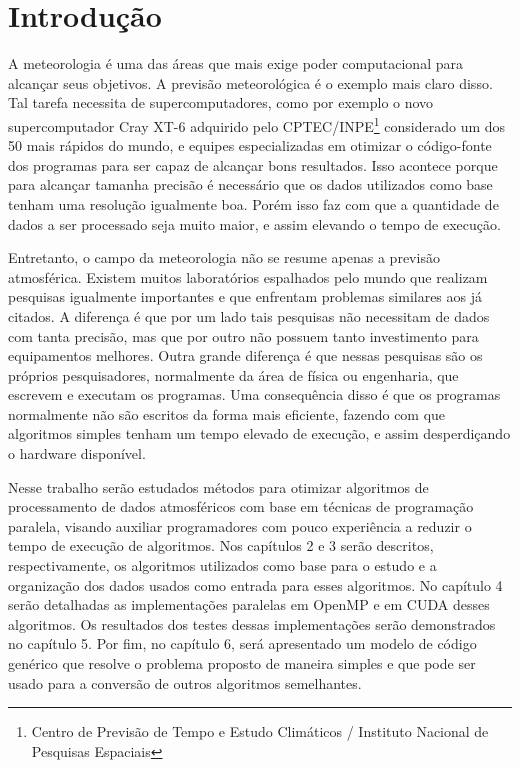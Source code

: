\chapter{Introdução}

A meteorologia é uma das áreas que mais exige poder computacional para alcançar seus objetivos. A previsão meteorológica é o exemplo mais claro disso. Tal tarefa necessita de supercomputadores, como por exemplo o novo supercomputador Cray XT-6 adquirido pelo CPTEC/INPE\footnote{Centro de Previsão de Tempo e Estudo Climáticos / Instituto Nacional de Pesquisas Espaciais} considerado um dos 50 mais rápidos do mundo, e equipes especializadas em otimizar o código-fonte dos programas para ser capaz de alcançar bons resultados. Isso acontece porque para alcançar tamanha precisão é necessário que os dados utilizados como base tenham uma resolução igualmente boa. Porém isso faz com que a quantidade de dados a ser processado seja muito maior, e assim elevando o tempo de execução.

Entretanto, o campo da meteorologia não se resume apenas a previsão atmosférica. Existem muitos laboratórios espalhados pelo mundo que realizam pesquisas igualmente importantes e que enfrentam problemas similares aos já citados. A diferença é que por um lado tais pesquisas não necessitam de dados com tanta precisão, mas que por outro não possuem tanto investimento para equipamentos melhores. Outra grande diferença é que nessas pesquisas são os próprios pesquisadores, normalmente da área de física ou engenharia, que escrevem e executam os programas. Uma consequência disso é que os programas normalmente não são escritos da forma mais eficiente, fazendo com que algoritmos simples tenham um tempo elevado de execução, e assim desperdiçando o hardware disponível.

Nesse trabalho serão estudados métodos para otimizar algoritmos de processamento de dados atmosféricos com base em técnicas de programação paralela, visando auxiliar programadores com pouco experiência a reduzir o tempo de execução de algoritmos. Nos capítulos 2 e 3 serão descritos, respectivamente, os algoritmos utilizados como base para o estudo e a organização dos dados usados como entrada para esses algoritmos. No capítulo 4 serão detalhadas as implementações paralelas em OpenMP e em CUDA desses algoritmos. Os resultados dos testes dessas implementações serão demonstrados no capítulo 5. Por fim, no capítulo 6, será apresentado um modelo de código genérico que resolve o problema proposto de maneira simples e que pode ser usado para a conversão de outros algoritmos semelhantes.